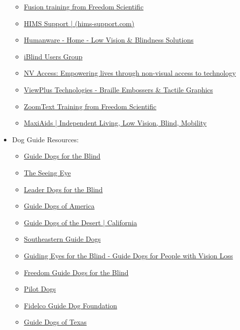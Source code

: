 \begin{itemize}[leftmargin=1.0cm]
\begin{itemize}
		      \item \href{https://www.freedomscientific.com/training/fusion/}{Fusion training from Freedom Scientific}
		      \item \href{https://hims-support.com/}{HIMS Support | (hims-support.com)}
		      \item \href{https://support.humanware.com/en-usa/support}{Humanware - Home - Low Vision \& Blindness Solutions}
		      \item \href{http://www.ibugtoday.com/}{iBlind Users Group}
		      \item \href{https://www.nvaccess.org/}{NV Access: Empowering lives through non-visual access to technology}
		      \item \href{https://viewplus.com/#main}{ViewPlus Technologies - Braille Embossers \& Tactile Graphics}
		      \item \href{https://www.freedomscientific.com/training/zoomtext/}{ZoomText Training from Freedom Scientific}
		      \item \href{https://www.maxiaids.com/}{MaxiAids | Independent Living, Low Vision, Blind, Mobility}
	      \end{itemize}
	\item Dog Guide Resources:
	      \begin{itemize}
		      \item \href{https://www.guidedogs.com/}{Guide Dogs for the Blind}
		      \item \href{https://www.seeingeye.org/}{The Seeing Eye}
		      \item \href{https://www.leaderdog.org/}{Leader Dogs for the Blind}
		      \item \href{https://www.guidedogsofamerica.org/}{Guide Dogs of America}
		      \item \href{https://guidedogsofthedesert.org/}{Guide Dogs of the Desert | California}
		      \item \href{https://www.guidedogs.org/#content}{Southeastern Guide Dogs}
		      \item \href{https://www.guidingeyes.org/}{Guiding Eyes for the Blind - Guide Dogs for People with Vision Loss}
		      \item \href{http://www.freedomguidedogs.com/}{Freedom Guide Dogs for the Blind}
		      \item \href{https://fidelco.org/}{Pilot Dogs}
		      \item \href{https://fidelco.org/}{Fidelco Guide Dog Foundation}
		      \item \href{https://guidedogsoftexas.org/}{Guide Dogs of Texas}

\end{itemize}
\end{itemize}
